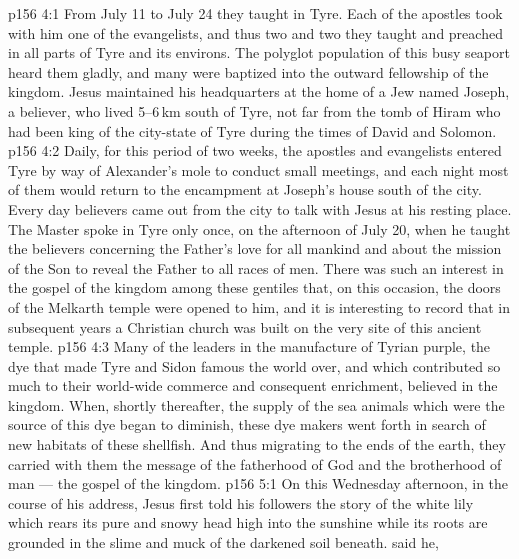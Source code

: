 \vs p156 4:1 From July 11 to July 24 they taught in Tyre. Each of the apostles took with him one of the evangelists, and thus two and two they taught and preached in all parts of Tyre and its environs. The polyglot population of this busy seaport heard them gladly, and many were baptized into the outward fellowship of the kingdom. Jesus maintained his headquarters at the home of a Jew named Joseph, a believer, who lived 5--6\,km south of Tyre, not far from the tomb of Hiram who had been king of the city\hyp{}state of Tyre during the times of David and Solomon.
\vs p156 4:2 Daily, for this period of two weeks, the apostles and evangelists entered Tyre by way of Alexander’s mole to conduct small meetings, and each night most of them would return to the encampment at Joseph’s house south of the city. Every day believers came out from the city to talk with Jesus at his resting place. The Master spoke in Tyre only once, on the afternoon of July 20, when he taught the believers concerning the Father’s love for all mankind and about the mission of the Son to reveal the Father to all races of men. There was such an interest in the gospel of the kingdom among these gentiles that, on this occasion, the doors of the Melkarth temple were opened to him, and it is interesting to record that in subsequent years a Christian church was built on the very site of this ancient temple.
\vs p156 4:3 Many of the leaders in the manufacture of Tyrian purple, the dye that made Tyre and Sidon famous the world over, and which contributed so much to their world\hyp{}wide commerce and consequent enrichment, believed in the kingdom. When, shortly thereafter, the supply of the sea animals which were the source of this dye began to diminish, these dye makers went forth in search of new habitats of these shellfish. And thus migrating to the ends of the earth, they carried with them the message of the fatherhood of God and the brotherhood of man --- the gospel of the kingdom.
\vs p156 5:1 On this Wednesday afternoon, in the course of his address, Jesus first told his followers the story of the white lily which rears its pure and snowy head high into the sunshine while its roots are grounded in the slime and muck of the darkened soil beneath.  said he, 
